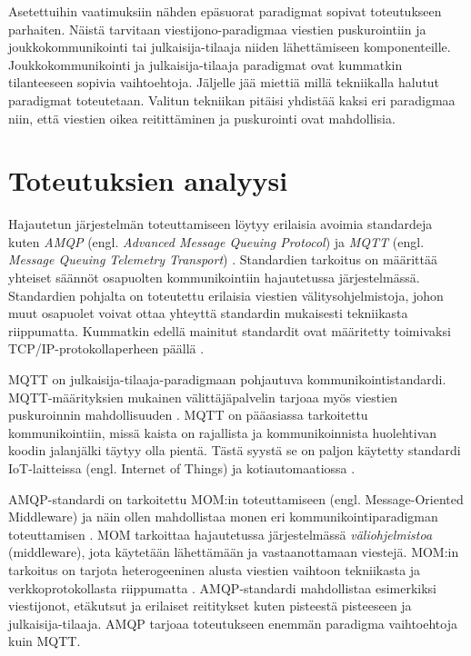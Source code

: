 Asetettuihin vaatimuksiin nähden epäsuorat paradigmat sopivat toteutukseen parhaiten. Näistä tarvitaan viestijono-paradigmaa viestien puskurointiin ja joukkokommunikointi tai julkaisija-tilaaja niiden lähettämiseen komponenteille. Joukkokommunikointi ja julkaisija-tilaaja paradigmat ovat kummatkin tilanteeseen sopivia vaihtoehtoja. Jäljelle jää miettiä millä tekniikalla halutut paradigmat toteutetaan. Valitun tekniikan pitäisi yhdistää kaksi eri paradigmaa niin, että viestien oikea reitittäminen ja puskurointi ovat mahdollisia.



\section{Toteutuksien analyysi}
Hajautetun järjestelmän toteuttamiseen löytyy erilaisia avoimia standardeja kuten \emph{AMQP} (engl. \emph{Advanced Message Queuing Protocol}) \cite{amqp-homepage} ja \emph{MQTT} (engl. \emph{Message Queuing Telemetry Transport}) \cite{mqtt-homepage}. Standardien tarkoitus on määrittää yhteiset säännöt osapuolten kommunikointiin hajautetussa järjestelmässä. Standardien pohjalta on toteutettu erilaisia viestien välitysohjelmistoja, johon muut osapuolet voivat ottaa yhteyttä standardin mukaisesti tekniikasta riippumatta. Kummatkin edellä mainitut standardit ovat määritetty toimivaksi TCP/IP-protokollaperheen päällä \cite[s.~1]{mqtt-specification} \cite[s.~22]{AMQP-specification}.

MQTT on julkaisija-tilaaja-paradigmaan pohjautuva kommunikointistandardi. MQTT\--mää\-ri\-tyk\-si\-en mukainen välittäjäpalvelin tarjoaa myös viestien puskuroinnin mahdollisuuden \cite{mqtt-specification}. MQTT on pääasiassa tarkoitettu kommunikointiin, missä kaista on rajallista ja kommunikoinnista huolehtivan koodin jalanjälki täytyy olla pientä. Tästä syystä se on paljon käytetty standardi IoT-laitteissa (engl. Internet of Things) ja kotiautomaatiossa \cite[s.~9--11]{mqtt-for-iot}.

AMQP-standardi on tarkoitettu MOM:in toteuttamiseen (engl. Message-Oriented Middleware) ja näin ollen mahdollistaa monen eri kommunikointiparadigman toteuttamisen \cite[s.~6]{AMQP-specification}. MOM tarkoittaa hajautetussa järjestelmässä \emph{väliohjelmistoa} (middleware), jota käytetään lähettämään ja vastaanottamaan viestejä. MOM:in tarkoitus on tarjota heterogeeninen alusta viestien vaihtoon tekniikasta ja verkkoprotokollasta riippumatta \cite{mom}. AMQP-standardi mahdollistaa esimerkiksi viestijonot, etäkutsut ja erilaiset reititykset kuten pisteestä pisteeseen ja julkaisija-tilaaja. AMQP tarjoaa toteutukseen enemmän paradigma vaihtoehtoja kuin MQTT.


